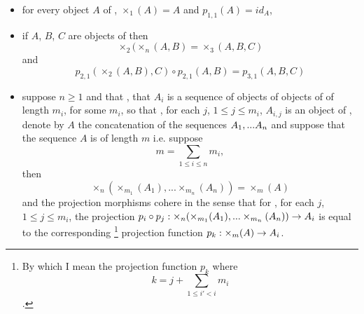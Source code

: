 \documentclass[10pt,a4paper]{scrartcl}
\begin{document}
\begin{definition}
\begin{itemize}
\begin{center}
\begin{displaymath}
\begin{array}{cp{.9cm}cp{.9cm}c}
\Rnode{A1}{A_1} & &   & &              \\ [0.3cm]
\Rnode{A2}{A_2} & &   & &              \\ [-0.1cm]
 \raisebox{-0.3cm}{\vdots} & & \Rnode{PROD}{\times_n}(\An)  & &  \\ [0.2cm]
\Rnode{An}{A_n} & &   & & 
\end{array}
\end{displaymath}
\end{center}
[0.55][0.5]
{
\setlength{\arroffsetA}{2pt}
\setlength{\arroffsetA}{0pt}
}
[0.55][0.5]
{
\setlength{\arroffsetA}{2pt}
\setlength{\arroffsetA}{0pt}
}
[0.55][0.5]
is a product diagram in $\catcw$ i.e for all objects $X$ of \catcw, for all morphisms $\fn$ of \catcw such that \foreachi, $f_i:X \morph A_i$ there is a unique
morphism $f$, $f: X \morph \times_n(\An)$ such that \foreachi, $f \circ p_i = f_i$. In situations where it is not ambiguous, the unique such $f$ corresponding to $\fn$ we write as
$\tuple{\fn}$,
\item
for every object $A$ of \catc, $\times_1(A)=A$ and $p_{1,1}(A) = id_A$,
\item
{}
if $A$, $B$, $C$  are objects of \catcw then
$$
	\times_2(\times_n(A,B)= \times_3(A,B,C)
$$
and
$$
p_{2,1}(\times_2(A,B),C) \circ p_{2,1}(A,B) = p_{3,1}(A,B,C) 
$$
\item suppose $n \geq 1$ and that \foreachi, that $A_i$ is a sequence of objects of objects of \catcw of length $m_i$, for some $m_i$,
so that \foreachi, for each $j$, $1 \leq j \leq m_i$, $A_{i,j}$ is an object of \catc,  denote by $A$ the concatenation of the sequences
$A_1,...A_n$ and suppose that the sequence $A$ is of length $m$ i.e. suppose  
$$m=\sum_{1 \leq i \leq n}m_i,$$ 
then
$$
\times_n (\times_{m_1}(A_1),...\times_{m_n}(A_n))= \times_m(A)
$$
and the projection morphisms cohere in the sense that for \foreachi, for each $j$, $1 \leq j \leq m_i$, 
the projection $p_i \circ p_j:\times_n (\times_{m_1}(A_1),...\times_{m_n}(A_n)) \rightarrow A_i$
is equal to the corresponding \footnote{
By which I mean the projection function $p_k$ where  $$k = j + \sum_{1 \leq i' < i}m_i$$.}
projection function $p_{k} : \times_m(A) \rightarrow A_i$.  
\end{itemize}
\end{definition}
\end{document}
